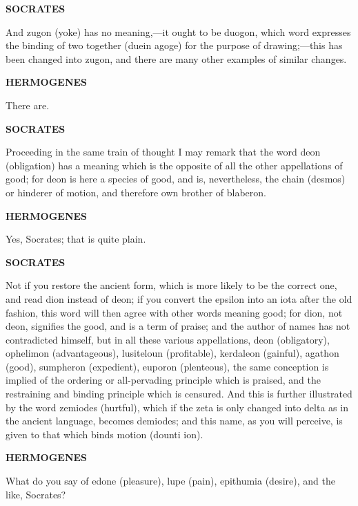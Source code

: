 \documentclass[11pt,letter]{article}
\begin{document}
\par \textbf{SOCRATES}
\par   And zugon (yoke) has no meaning,—it ought to be duogon, which word expresses the binding of two together (duein agoge) for the purpose of drawing;—this has been changed into zugon, and there are many other examples of similar changes.

\par \textbf{HERMOGENES}
\par   There are.

\par \textbf{SOCRATES}
\par   Proceeding in the same train of thought I may remark that the word deon (obligation) has a meaning which is the opposite of all the other appellations of good; for deon is here a species of good, and is, nevertheless, the chain (desmos) or hinderer of motion, and therefore own brother of blaberon.

\par \textbf{HERMOGENES}
\par   Yes, Socrates; that is quite plain.

\par \textbf{SOCRATES}
\par   Not if you restore the ancient form, which is more likely to be the correct one, and read dion instead of deon; if you convert the epsilon into an iota after the old fashion, this word will then agree with other words meaning good; for dion, not deon, signifies the good, and is a term of praise; and the author of names has not contradicted himself, but in all these various appellations, deon (obligatory), ophelimon (advantageous), lusiteloun (profitable), kerdaleon (gainful), agathon (good), sumpheron (expedient), euporon (plenteous), the same conception is implied of the ordering or all-pervading principle which is praised, and the restraining and binding principle which is censured. And this is further illustrated by the word zemiodes (hurtful), which if the zeta is only changed into delta as in the ancient language, becomes demiodes; and this name, as you will perceive, is given to that which binds motion (dounti ion).

\par \textbf{HERMOGENES}
\par   What do you say of edone (pleasure), lupe (pain), epithumia (desire), and the like, Socrates?
\end{document}
